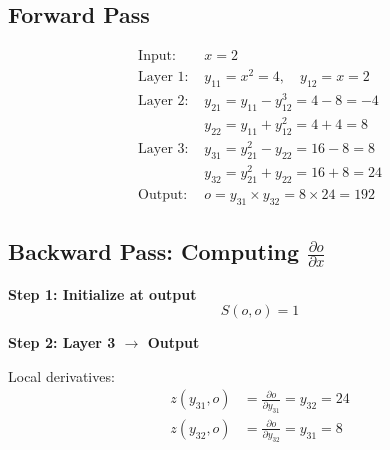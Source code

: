 \begin{notechapter}
\begin{center}
\end{center}

\subsection{Forward Pass}

\begin{align*}
\text{Input: } & x = 2\\[0.5em]
\text{Layer 1: } & y_{11} = x^2 = 4, \quad y_{12} = x = 2\\[0.5em]
\text{Layer 2: } & y_{21} = y_{11} - y_{12}^3 = 4 - 8 = -4\\
& y_{22} = y_{11} + y_{12}^2 = 4 + 4 = 8\\[0.5em]
\text{Layer 3: } & y_{31} = y_{21}^2 - y_{22} = 16 - 8 = 8\\
& y_{32} = y_{21}^2 + y_{22} = 16 + 8 = 24\\[0.5em]
\text{Output: } & o = y_{31} \times y_{32} = 8 \times 24 = \boxed{192}
\end{align*}

\subsection{Backward Pass: Computing $\frac{\partial o}{\partial x}$}

\textbf{Step 1: Initialize at output}
$$S(o,o) = 1$$

\textbf{Step 2: Layer 3 $\to$ Output}

Local derivatives:
\begin{align*}
z(y_{31},o) &= \frac{\partial o}{\partial y_{31}} = y_{32} = 24\\
z(y_{32},o) &= \frac{\partial o}{\partial y_{32}} = y_{31} = 8
\end{align*}


\end{notechapter}
